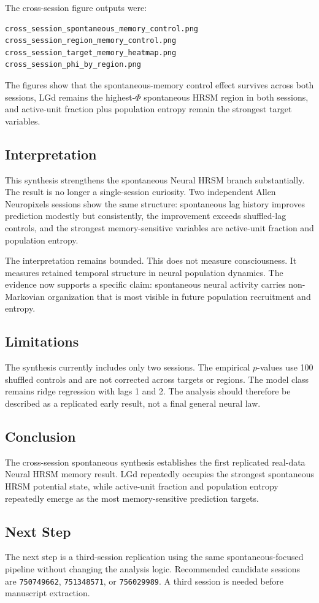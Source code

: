 The cross-session figure outputs were:

\begin{verbatim}
cross_session_spontaneous_memory_control.png
cross_session_region_memory_control.png
cross_session_target_memory_heatmap.png
cross_session_phi_by_region.png
\end{verbatim}

The figures show that the spontaneous-memory control effect survives across both sessions, LGd remains the highest-\(\Phi\) spontaneous HRSM region in both sessions, and active-unit fraction plus population entropy remain the strongest target variables.

\subsection{Interpretation}

This synthesis strengthens the spontaneous Neural HRSM branch substantially. The result is no longer a single-session curiosity. Two independent Allen Neuropixels sessions show the same structure: spontaneous lag history improves prediction modestly but consistently, the improvement exceeds shuffled-lag controls, and the strongest memory-sensitive variables are active-unit fraction and population entropy.

The interpretation remains bounded. This does not measure consciousness. It measures retained temporal structure in neural population dynamics. The evidence now supports a specific claim: spontaneous neural activity carries non-Markovian organization that is most visible in future population recruitment and entropy.

\subsection{Limitations}

The synthesis currently includes only two sessions. The empirical \(p\)-values use 100 shuffled controls and are not corrected across targets or regions. The model class remains ridge regression with lags 1 and 2. The analysis should therefore be described as a replicated early result, not a final general neural law.

\subsection{Conclusion}

The cross-session spontaneous synthesis establishes the first replicated real-data Neural HRSM memory result. LGd repeatedly occupies the strongest spontaneous HRSM potential state, while active-unit fraction and population entropy repeatedly emerge as the most memory-sensitive prediction targets.

\subsection{Next Step}

The next step is a third-session replication using the same spontaneous-focused pipeline without changing the analysis logic. Recommended candidate sessions are \texttt{750749662}, \texttt{751348571}, or \texttt{756029989}. A third session is needed before manuscript extraction.
